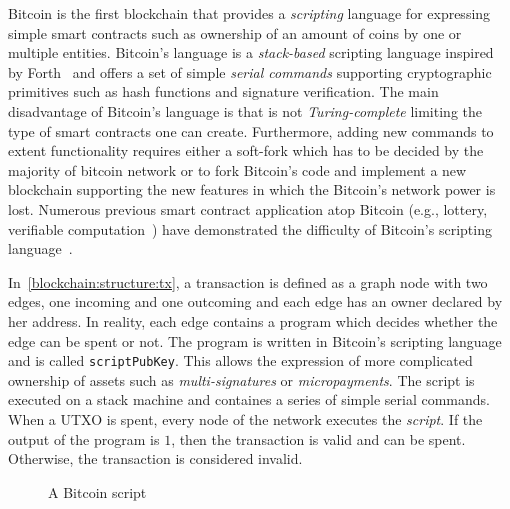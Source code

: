 Bitcoin is the first blockchain that provides a \textit{scripting} language for expressing simple smart contracts such as ownership of an amount of coins by one or multiple entities. Bitcoin's language is a \textit{stack-based} scripting language inspired by Forth~\cite{forth_lang} and offers a set of simple \textit{serial commands} supporting cryptographic primitives such as hash functions and signature verification. The main disadvantage of Bitcoin's language is that is not \textit{Turing-complete} limiting the type of smart contracts one can create. Furthermore, adding new commands to extent functionality requires either a soft-fork which has to be decided by the majority of bitcoin network or to fork Bitcoin's code and implement a new blockchain supporting the new features in which the Bitcoin's network power is lost. Numerous previous smart contract application atop Bitcoin (e.g., lottery\cite{Andrychowicz:2014:SMC:2650286.2650764,10.1007/978-3-662-44381-1_24}, verifiable computation~\cite{Kumaresan:2014:UBI:2660267.2660380}) have demonstrated the difficulty of Bitcoin's scripting language~\cite{cryptoeprint:2015:675}.

In~\ref{blockchain:structure:tx}, a transaction is defined as a graph node with two edges, one incoming and one outcoming and each edge has an owner declared by her address. In reality, each edge contains a program which decides whether the edge can be spent or not. The program is written in Bitcoin's scripting language and is called \verb|scriptPubKey|. This allows the expression of more complicated ownership of assets such as \textit{multi-signatures} or \textit{micropayments}. The script is executed on a stack machine and containes a series of simple serial commands. When a UTXO is spent, every node of the network executes the \textit{script}. If the output of the program is $1$, then the transaction is valid and can be spent. Otherwise, the transaction is considered invalid.

\begin{figure}[!ht]
  \centering
  \caption{A Bitcoin script}
  \label{fig:bl_tx:script}
\end{figure}

